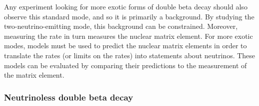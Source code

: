 \documentclass[herrin-thesis.tex]{subfiles}
\begin{document}
Any experiment looking for more exotic forms of double beta decay should also observe this standard mode, and so it is primarily a background. By studying the two-neutrino-emitting mode, this background can be constrained. Moreover, measuring the rate in turn measures the nuclear matrix element. For more exotic modes, models must be used to predict the nuclear matrix elements in order to translate the rates (or limits on the rates) into statements about neutrinos. These models can be evaluated by comparing their predictions to the measurement of the \twonu{} matrix element.

\subsubsection{Neutrinoless double beta decay}
\end{document}
